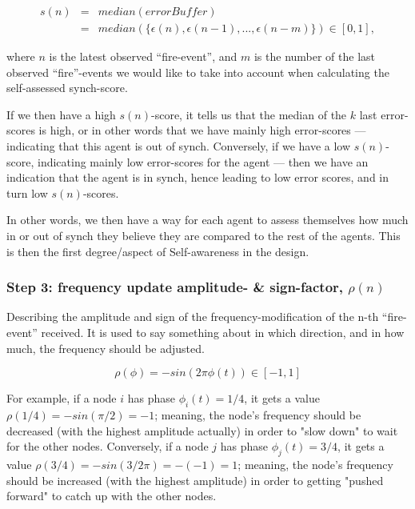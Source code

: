 	\begin{equation}
	\label{self_assessed_synch}
		\begin{array}{rrclcl}
		s(n) & = & median(errorBuffer) \\ 
		& = & median(\{\epsilon(n), \epsilon(n-1), ... , \epsilon(n-m)\}) \in [0, 1],
		\end{array}
	\end{equation} \nl
	
	where $n$ is the latest observed ``fire-event'', and $m$ is the number of the last observed ``fire''-events we would like to take into account when calculating the self-assessed synch-score.
	
	If we then have a high $s(n)$-score, it tells us that the median of the $k$ last error-scores is high, or in other words that we have mainly high error-scores — indicating that this agent is out of synch. Conversely, if we have a low $s(n)$-score, indicating mainly low error-scores for the agent — then we have an indication that the agent is in synch, hence leading to low error scores, and in turn low $s(n)$-scores. 
	
	In other words, we then have a way for each agent to assess themselves how much in or out of synch they believe they are compared to the rest of the agents. This is then the first degree/aspect of  Self-awareness in the design.
	
	\subsubsection{Step 3: frequency update amplitude- \& sign-factor, $\rho(n)$}
	
	Describing the amplitude and sign of the frequency-modification of the n-th ``fire-event'' received. It is used to say something about in which direction, and in how much, the frequency should be adjusted.
	
	\begin{equation}
	\label{amp_sign_freq_adj}
		\rho(\phi) = - sin(2\pi\phi(t)) \in [-1, 1]
	\end{equation}
	
	For example, if a node $i$ has phase $\phi_i(t)=1/4$, it gets a value $\rho(1/4) = - sin(\pi/2) = -1$; meaning, the node's frequency should be decreased (with the highest amplitude actually) in order to "slow down" to wait for the other nodes. Conversely, if a node $j$ has phase $\phi_j(t)=3/4$, it gets a value $\rho(3/4) = - sin(3/2 \pi) = -(-1) = 1$; meaning, the node's frequency should be increased (with the highest amplitude) in order to getting "pushed forward" to catch up with the other nodes.
	
